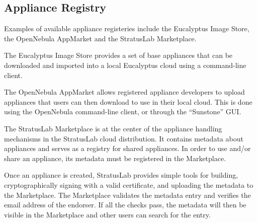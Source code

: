 \subsection{Appliance Registry}

Examples of available appliance registeries include the Eucalyptus Image Store, the OpenNebula 
AppMarket and the StratusLab Marketplace.

The Eucalyptus Image Store provides a set of base appliances that can be downloaded and 
imported into a local Eucalyptus cloud using a command-line client.

The OpenNebula AppMarket allows registered appliance developers to upload appliances that 
users can then download to use in their local cloud. This is done using the OpenNebula command-line 
client, or through the ``Sunstone'' GUI.

The StratusLab Marketplace is at the center of the appliance handling
mechanisms in the StratusLab cloud distribution. It contains metadata 
about appliances and serves as a registry for shared appliances. 
In order to use and/or share an appliance, its metadata must be registered 
in the Marketplace\@. 

Once an appliance is created, StratusLab provides simple tools for 
building, cryptographically signing with a valid
certificate, and uploading the metadata to the Marketplace\@.  The Marketplace
validates the metadata entry and verifies the 
email address of the endorser.  If all the checks pass, 
the metadata will then be visible in the Marketplace and other users 
can search for the entry.
